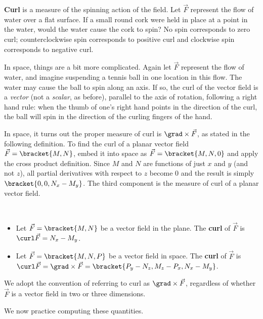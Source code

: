 \textbf{Curl} is a measure of the spinning action of the field. Let $\vec F$ represent the flow of water over a flat surface. If a small round cork were held in place at a point in the water, would the water cause the cork to spin? No spin corresponds to zero curl; counterclockwise spin corresponds to positive curl and clockwise spin corresponds to negative curl. 

In space, things are a bit more complicated. Again let $\vec F$ represent the flow of water, and imagine suspending a tennis ball in one location in this flow. The water may cause the ball to spin along an axis. If so, the curl of the vector field is a \emph{vector} (not a \emph{scalar}, as before), parallel to the axis of rotation, following a right hand rule: when the thumb of one's right hand points in the direction of the curl, the ball will spin in the direction of the curling fingers of the hand.

In space, it turns out the proper measure of curl is $\grad \times \vec F$, as stated in the following definition. To find the curl of a planar vector field $\vec F =\bracket{M,N}$, embed it into space as $\vec F =\bracket{M, N, 0}$ and apply the cross product definition. Since $M$ and $N$ are functions of just $x$ and $y$ (and not $z$), all partial derivatives with respect to $z$ become 0 and the result is simply $\bracket{0,0,N_x-M_y}$. The third component is the measure of curl of a planar vector field. 

\begin{definition}\label{def:curl}
\mbox{}\\[-2\baselineskip]\parbox[t]{\linewidth}{\begin{itemize}
	\item Let $\vec F =\bracket{M,N}$ be a vector field in the plane. The \textbf{curl} of $\vec F$ is $\curl \vec F = N_x - M_y$.
	\item Let $\vec F =\bracket{M,N,P}$ be a vector field in space. The \textbf{curl} of $\vec F$ is $\curl \vec F = \grad \times \vec F =\bracket{P_y-N_z,M_z-P_x,N_x - M_y}$.
\end{itemize}}
\end{definition}

We adopt the convention of referring to curl as $\grad \times \vec F$, regardless of whether $\vec F$ is a vector field in two or three dimensions. 

We now practice computing these quantities.

